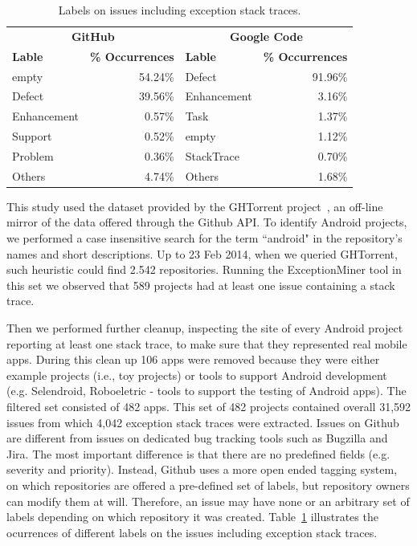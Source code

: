 \documentclass[conference]{IEEEtran}
\begin{document}
\begin{table}
  \centering
  \begin{tabular}{lr|lr}
    \hline
     \multicolumn{2}{c}{\bfseries{GitHub}} &  \multicolumn{2}{c}{\bfseries{Google Code}} \\
      \bfseries{Lable} &  \bfseries{\% Occurrences} &  \bfseries{Lable} &  \bfseries{\% Occurrences} \\
    \hline
empty &	54.24\% & Defect &	91.96\% \\
Defect &	39.56\%  & Enhancement  &	3.16\% \\
Enhancement &	0.57\% & Task	& 1.37\% \\
Support &	0.52\% & empty &	1.12\% \\
Problem &	0.36\% & StackTrace &	0.70\% \\
Others &	4.74\% &  Others &	1.68\% \\   
  \hline
  \end{tabular}
  \caption{Labels on issues including exception stack traces.}
  \label{tab:lables}
\end{table}


This study used the dataset provided by the GHTorrent project~\cite{Gousi13}, 
an off-line mirror of the data  offered through the Github API.  
To identify Android projects, we performed a case insensitive search for the
term ``android" in the repository's names and short descriptions.  
Up to 23 Feb 2014,  when we queried GHTorrent, such heuristic could
 find 2.542 repositories. Running the ExceptionMiner tool 
 in this set we observed that 589 projects had at least one issue containing a stack trace.
	
Then we performed further cleanup, inspecting the site of every Android project
reporting at least one stack trace, to make sure that they represented real
mobile apps. During this clean up 106 apps were removed because they were either
example projects (i.e., toy projects) or tools to support Android development
(e.g. Selendroid, Roboeletric - tools to support the testing of Android apps).
The filtered set consisted of 482 apps. This set of 482 projects contained overall 31,592 issues from which 4,042 exception stack traces 
were extracted. Issues on Github are different from issues on dedicated bug tracking tools such as 
Bugzilla and Jira. The most important difference is that there are no predefined fields
  (e.g. severity and priority). Instead, Github uses a more open ended tagging system, on which
repositories are offered a pre-defined set of labels, but repository owners can modify 
them at will. Therefore, an issue may have none or an arbitrary set of labels depending 
on which repository it was created. Table~\ref{tab:lables} illustrates the ocurrences of different labels 
on the issues including exception stack traces.
\end{document}
